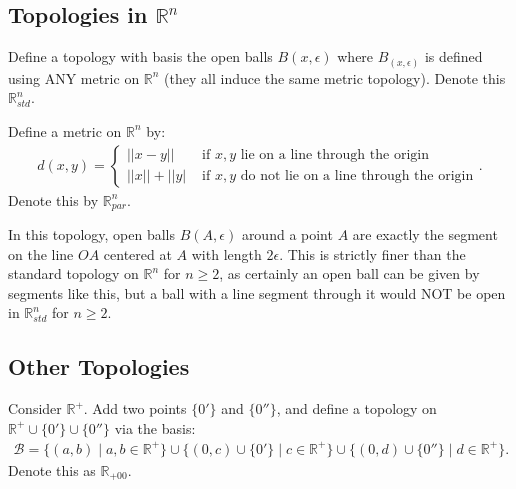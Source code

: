 \documentclass[12pt,letterpaper,reqno]{article}
\begin{document}
\subsection{Topologies in $\mathbb{R}^n$}


\begin{topology}\label{topology:rn-std-topology}
    Define a topology with basis the open balls $B(x, \epsilon)$ where $B_(x, \epsilon)$ is defined using ANY metric on $\mathbb{R}^{n}$ (they all induce the same metric topology). Denote this $\mathbb{R}^{n}_{std}$.
\end{topology}

\begin{topology}\label{topology:rn-par-topology}
    Define a metric on $\mathbb{R}^{n}$ by:
    \begin{align*}
        d(x, y) = \begin{cases} ||x-y|| & \text{ if $x, y$ lie on a line through the origin} \\
        ||x|| + ||y| & \text{ if $x, y$ do not lie on a line through the origin}
        \end{cases}.
    \end{align*}
    Denote this by $\mathbb{R}_{par}^{n}$.
\end{topology}

In this topology, open balls $B(A, \epsilon)$ around a point $A$ are exactly the segment on the line $OA$ centered at $A$ with length $2 \epsilon$. This is strictly finer than the standard topology on $\mathbb{R}^{n}$ for $n \ge 2$, as certainly an open ball can be given by segments like this, but a ball with a line segment through it would NOT be open in $\mathbb{R}^{n}_{std}$ for $n \ge 2$. 


\subsection{Other Topologies}

\begin{topology}\label{topology:r-00-topology}
    Consider $\mathbb{R}^{+}$. Add two points $\{ 0' \}$ and $\{ 0 '' \}$, and define a topology on $\mathbb{R}^+ \cup \{ 0 ' \} \cup \{ 0'' \}$ via the basis:
    \begin{align*}
        \mathcal{B} = \{ (a, b) \mid a, b \in \mathbb{R}^+ \} \cup \{ (0, c) \cup \{ 0' \} \mid c \in \mathbb{R}^+ \} \cup \{ (0, d) \cup \{0''\} \mid d \in \mathbb{R}^+ \}.
    \end{align*}
    Denote this as $\mathbb{R}_{+00}$. 
\end{topology}
\end{document}

